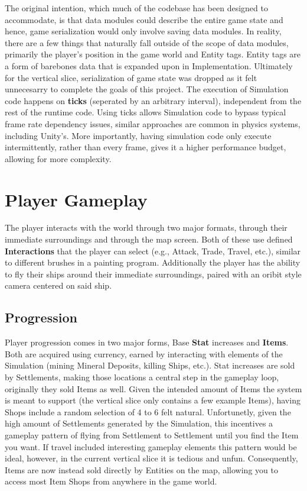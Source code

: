\documentclass{report}
\begin{document}
The original intention, which much of the codebase has been designed to accommodate, is that data modules could describe the entire game state and hence, game serialization would only involve saving data modules. In reality, there are a few things that naturally fall outside of the scope of data modules, primarily the player's position in the game world and Entity tags. Entity tags are a form of barebones data that is expanded upon in Implementation. Ultimately for the vertical slice, serialization of game state was dropped as it felt unnecesarry to complete the goals of this project.
\newline
\newline
The execution of Simulation code happens on \textbf{ticks} (seperated by an arbitrary interval), independent from the rest of the runtime code. Using ticks allows Simulation code to bypass typical frame rate dependency issues, similar approaches are common in physics systems, including Unity's. More importantly, having simulation code only execute intermittently, rather than every frame, gives it a higher performance budget, allowing for more complexity.

\section{Player Gameplay}

The player interacts with the world through two major formats, through their immediate surroundings and through the map screen. Both of these use defined \textbf{Interactions} that the player can select (e.g., Attack, Trade, Travel, etc.), similar to different brushes in a painting program. Additionally the player has the ability to fly their ships around their immediate surroundings, paired with an oribit style camera centered on said ship.

\subsection{Progression}

Player progression comes in two major forms, Base \textbf{Stat} increases and \textbf{Items}. Both are acquired using currency, earned by interacting with elements of the Simulation (mining Mineral Deposits, killing Ships, etc.). Stat increases are sold by Settlements, making those locations a central step in the gameplay loop, originally they sold Items as well. Given the intended amount of Items the system is meant to support (the vertical slice only contains a few example Items), having Shops include a random selection of 4 to 6 felt natural. Unfortunetly, given the high amount of Settlements generated by the Simulation, this incentives a gameplay pattern of flying from Settlement to Settlement until you find the Item you want. If travel included interesting gameplay elements this pattern would be ideal, however, in the current vertical slice it is tedious and unfun. Consequently, Items are now instead sold  directly by Entities on the map, allowing you to access most Item Shops from anywhere in the game world.
\end{document}
